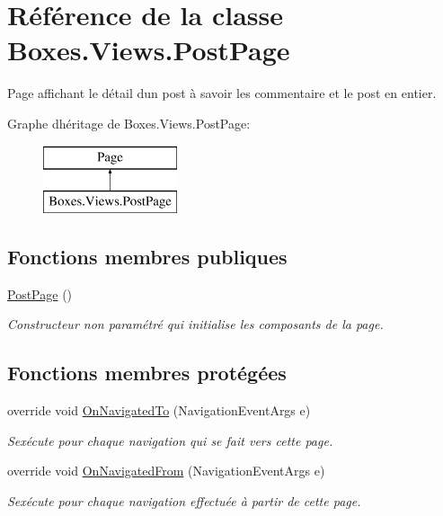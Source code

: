 \hypertarget{class_boxes_1_1_views_1_1_post_page}{}\section{Référence de la classe Boxes.\+Views.\+Post\+Page}
\label{class_boxes_1_1_views_1_1_post_page}


Page affichant le détail d\textquotesingle{}un post à savoir les commentaire et le post en entier.  


Graphe d\textquotesingle{}héritage de Boxes.\+Views.\+Post\+Page\+:\begin{figure}[H]
\begin{center}
\leavevmode
\includegraphics[height=2.000000cm]{class_boxes_1_1_views_1_1_post_page}
\end{center}
\end{figure}
\subsection*{Fonctions membres publiques}
\begin{DoxyCompactItemize}
\item 
\hyperlink{class_boxes_1_1_views_1_1_post_page_a34b08c337fa8b796a1b58c4a354185a6}{Post\+Page} ()
\begin{DoxyCompactList}\small\item\em Constructeur non paramétré qui initialise les composants de la page. \end{DoxyCompactList}\end{DoxyCompactItemize}
\subsection*{Fonctions membres protégées}
\begin{DoxyCompactItemize}
\item 
override void \hyperlink{class_boxes_1_1_views_1_1_post_page_a48c4b774b8aa3ebbd307b8670f2176a2}{On\+Navigated\+To} (Navigation\+Event\+Args e)
\begin{DoxyCompactList}\small\item\em S\textquotesingle{}exécute pour chaque navigation qui se fait vers cette page. \end{DoxyCompactList}\item 
override void \hyperlink{class_boxes_1_1_views_1_1_post_page_a9d5ad9dd181ee8e03761e91c52f8f181}{On\+Navigated\+From} (Navigation\+Event\+Args e)
\begin{DoxyCompactList}\small\item\em S\textquotesingle{}exécute pour chaque navigation effectuée à partir de cette page. \end{DoxyCompactList}\end{DoxyCompactItemize}
